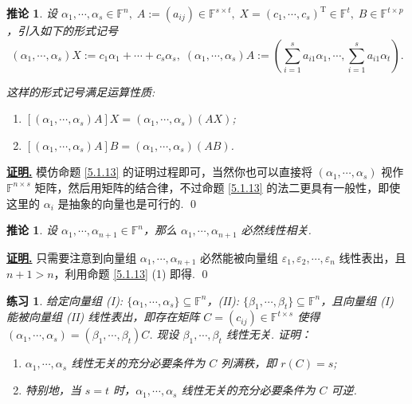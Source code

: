 \documentclass[10pt,openany]{article}
\theoremstyle{thmstyle} %
\newtheorem{practice}{练习}[section]
\theoremstyle{defstyle} %
\newtheorem{corollary}[theorem]{推论}
\theoremstyle{prostyle} %
\theoremstyle{exastyle}
\theoremstyle{remstyle}
\renewenvironment{proof}[1][证明]{\par\underline{\textbf{#1.}} \;\fangsong}{\qed\par}
\newcommand{\T}{^{\text{T}}}
\newcommand{\F}{\mathbb{F}}
\begin{document}
\begin{corollary} \label{5.1.14}
	设 \( \alpha_1,\cdots,\alpha_s \in \F^n, \; A:=(a_{ij}) \in \F^{s \times t}, \; X=(c_1,\cdots,c_s)\T \in \F^{t}, \; B \in \F^{t \times p} \)，引入如下的形式记号
	\[ (\alpha_1,\cdots,\alpha_s)X:=c_1\alpha_1+\cdots+c_s\alpha_s, \; (\alpha_1,\cdots,\alpha_s)A:=\left( \sum_{i=1}^{s} a_{i1}\alpha_1, \cdots, \sum_{i=1}^{s} a_{i1}\alpha_t \right). \]
	
	这样的形式记号满足运算性质:
	\begin{enumerate}[(1)]
		\item \( [(\alpha_1,\cdots,\alpha_s)A]X=(\alpha_1,\cdots,\alpha_s)(AX) \);
		\item \( [(\alpha_1,\cdots,\alpha_s)A]B=(\alpha_1,\cdots,\alpha_s)(AB) \).
	\end{enumerate}
\end{corollary}


\begin{proof} 
	模仿命题 \ref{5.1.13} 的证明过程即可，当然你也可以直接将 \( (\alpha_1,\cdots,\alpha_s) \) 视作 \( \F^{n \times s} \) 矩阵，然后用矩阵的结合律，不过命题 \ref{5.1.13} 的法二更具有一般性，即使这里的 \( \alpha_i \) 是抽象的向量也是可行的.
\end{proof}


\begin{corollary} \label{5.1.15}
	设 \( \alpha_1,\cdots,\alpha_{n+1} \in \F^n \)，那么 \( \alpha_1,\cdots,\alpha_{n+1} \) 必然线性相关.
\end{corollary}

\begin{proof}
	只需要注意到向量组 \( \alpha_1,\cdots,\alpha_{n+1} \) 必然能被向量组 \( \varepsilon_1, \varepsilon_2, \cdots, \varepsilon_n \) 线性表出，且 \( n+1>n \)，利用命题 \ref{5.1.13} (1) 即得.
\end{proof}

\begin{practice} \label{prac5.1}
	给定向量组 (I): \( \{\alpha_1,\cdots,\alpha_s\} \subseteq \F^n \)，(II): \( \{\beta_1,\cdots,\beta_t\} \subseteq \F^n \)，且向量组 (I) 能被向量组 (II) 线性表出，即存在矩阵 \( C=(c_{ij}) \in \F^{t \times s} \) 使得 \( (\alpha_1,\cdots,\alpha_s)=(\beta_1,\cdots,\beta_t)C \). 现设 \( \beta_1,\cdots,\beta_t \) 线性无关. 证明：
	\begin{enumerate}[(1)]
		\item \( \alpha_1,\cdots,\alpha_s \) 线性无关的充分必要条件为 \( C \) 列满秩，即 \( r(C)=s \);
		\item 特别地，当 \( s=t \) 时，\( \alpha_1,\cdots,\alpha_s \) 线性无关的充分必要条件为 \( C \) 可逆.
	\end{enumerate}
\end{practice}
\end{document}
